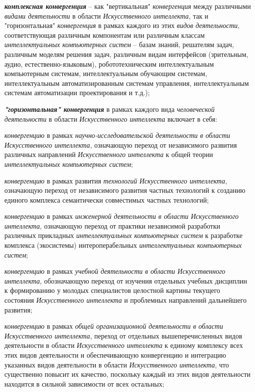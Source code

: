 \begin{textitemize}
	\item
	\textbf{\textit{комплексная конвергенция}} -- как "вертикальная"{} \textit{конвергенция} между различными \textit{видами деятельности} в области \textit{Искусственного интеллекта}, так и "горизонтальная"{} \textit{конвергенция} в рамках каждого из этих \textit{видов деятельности}, соответствующая различным компонентам или различным классам \textit{интеллектуальных компьютерных систем} -- базам знаний, решателям задач, различным моделям решения задач, различным видам интерфейсов (зрительным, аудио, естественно-языковым), робототехническим интеллектуальным компьютерным системам, интеллектуальным обучающим системам, интеллектуальным автоматизированным системам управления, интеллектуальным системам автоматизации проектирования и т.д.);
	\item
	\textbf{\textit{"горизонтальная"{} конвергенция}} в рамках каждого вида \textit{человеческой деятельности} в области \textit{Искусственного интеллекта} включает в себя:
	
	\begin{textitemize}
		\item
		\textit{конвергенцию} в рамках \textit{научно-исследовательской деятельности в области Искусственного интеллекта}, означающую переход от независимого развития различных направлений \textit{Искусственного интеллекта} к общей теории \textit{интеллектуальных компьютерных систем};
		\item
		\textit{конвергенцию} в рамках развития \textit{технологий Искусственного интеллекта}, означающую переход от независимого развития частных технологий к созданию единого комплекса семантически совместимых частных технологий;
		\item
		\textit{конвергенцию} в рамках \textit{инженерной деятельности в области Искусственного интеллекта}, означающую переход от практики независимой разработки различных прикладных \textit{интеллектуальных компьютерных систем} к разработке комплекса (экосистемы) интероперабельных \textit{интеллектуальных компьютерных систем};
		\item
		\textit{конвергенцию} в рамках \textit{учебной деятельности в области Искусственного интеллекта}, обозначающую переход от изучения отдельных учебных дисциплин к формированию у молодых специалистов целостной картины текущего состояния \textit{Искусственного интеллекта} и проблемных направлений дальнейшего развития;
		\item
		\textit{конвергенцию} в рамках \textit{общей организационной деятельности в области Искусственного интеллекта}, переход от отдельных вышеперечисленных видов деятельности в области \textit{Искусственного интеллекта} к единому комплексу всех этих видов деятельности и обеспечивающую конвергенцию и интеграцию указанных видов деятельности в области \textit{Искусственного интеллекта}, что существенно повысит их качество, поскольку каждый из этих видов деятельности находится в сильной зависимости от всех остальных;
	\end{textitemize}
	

\end{textitemize}
